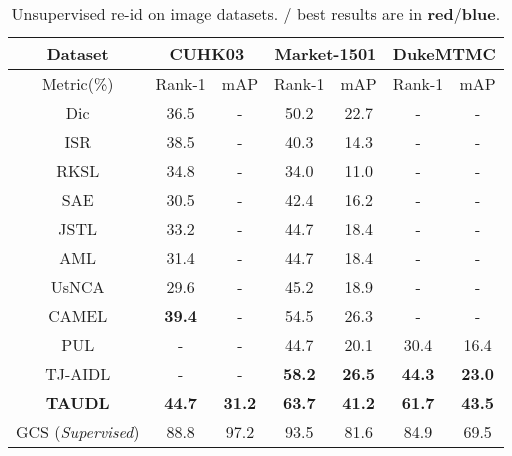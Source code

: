 \documentclass[runningheads]{llncs}
\begin{document}
\begin{table}[h]
	\centering
	\setlength{\tabcolsep}{0.2cm}
	\caption{Unsupervised re-id on image datasets. 
		/ best results are in \textbf{\color{red}red}/\textbf{\color{blue}blue}.}
	\label{tab:img_SOTA}
	\begin{tabular}
		{c||c|c||c|c||c|c}
		\hline
		{Dataset}						
		& \multicolumn{2}{c||}{CUHK03\cite{li2014deepreid}}      
		& \multicolumn{2}{c||}{Market-1501\cite{zheng2015scalable}}                    	
		& \multicolumn{2}{c}{DukeMTMC\cite{zheng2017unlabeled}}    						\\ \hline 
		{Metric(\%)}		& Rank-1	& mAP		& Rank-1	& mAP 		& Rank-1	& mAP
		\\ \hline \hline
		Dic\cite{kodirov2015dictionary}	& 36.5	& -         & 50.2	& 22.7		& - 		& -
		\\
		ISR\cite{lisanti2015person}		& 38.5   & -         & 40.3 	& 14.3 		& -         & - 
		\\ 
		RKSL\cite{wang2016towards}		& 34.8   & -         & 34.0   & 11.0          & -         & - 
		\\ \hline
		SAE\cite{lee2008sparse}			& 30.5   & -         & 42.4   & 16.2          & -         & -
		\\
		JSTL\cite{xiao2016learning}		& 33.2   & -         & 44.7   & 18.4          & -       	& - 
		\\
		AML\cite{ye2007adaptive}			& 31.4	& -         & 44.7   & 18.4		& -        & - 
		\\
		UsNCA\cite{qin2015unsupervised}	& 29.6	& -         & 45.2   & 18.9		& -        & - 
		\\
		CAMEL \cite{yu2017cross}		
		& \textbf{\color{blue}39.4} 		& -       
		& {54.5} 					& {26.3} 
		& -                             	 	& -
		\\
		PUL \cite{fan2017unsupervised}	
		& -                     & -                             
		& 44.7                & 20.1           
		& 30.4			& 16.4        	    	
		\\ 
		TJ-AIDL \cite{want2018Transfer}
		& - 				& - 
		&\bf \color{blue} 58.2 	&\bf\color{blue} 26.5 
		&\bf\color{blue} 44.3 		&\bf\color{blue} 23.0 \\
		\hline
		\textbf{TAUDL}                                	
		& \textbf{\color{red}44.7} 	& \textbf{\color{red}31.2} 
		& \textbf{\color{red}63.7}	& \textbf{\color{red}41.2} 
		& \textbf{\color{red}61.7} 	& \textbf{\color{red}43.5}
		\\ \hline
		GCS \cite{chen2018group}({\em Supervised})	& 88.8	& 97.2         & 93.5	& 81.6		& 84.9 	& 69.5
		\\ \hline
	\end{tabular}
\end{table}
\end{document}
